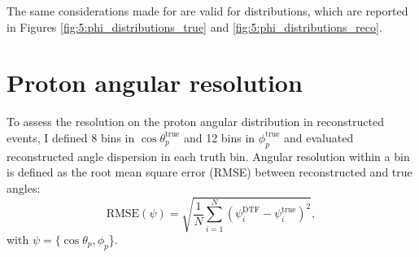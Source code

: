 The same considerations made for \cthetap are valid for \phip distributions, which are reported in Figures \ref{fig:5:phi_distributions_true} and \ref{fig:5:phi_distributions_reco}.

\section{Proton angular resolution}
\label{sec:5:angular_resolution}

To assess the resolution on the proton angular distribution in reconstructed \demonstratorshort events, I defined 8 bins in $\cos\theta_p^\text{true}$ and 12 bins in $\phi_p^\text{true}$ and evaluated reconstructed angle dispersion in each truth bin. 
Angular resolution within a bin is defined as the root mean square error (RMSE) between reconstructed and true angles:
\begin{equation}
	\text{RMSE}(\psi) = \sqrt{\frac{1}{N} \sum_{i=1}^N {\left(\psi_i^\text{DTF} - \psi_i^\text{true}\right)}^2},
\end{equation}
with $\psi = \{\cos\theta_p, \phi_p$\}.

